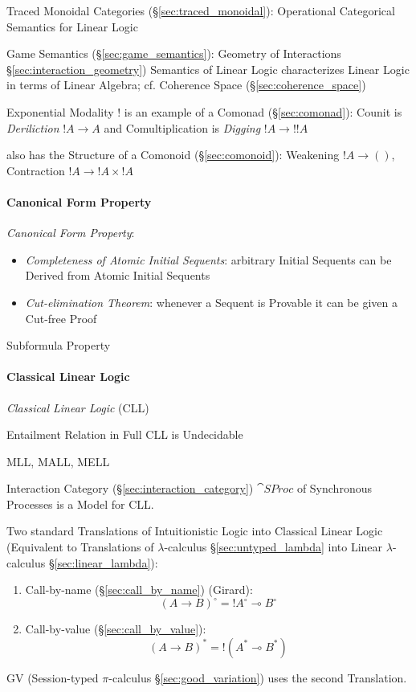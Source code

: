 Traced Monoidal Categories (\S\ref{sec:traced_monoidal}): Operational
Categorical Semantics for Linear Logic

Game Semantics (\S\ref{sec:game_semantics}): Geometry of Interactions
\S\ref{sec:interaction_geometry}) Semantics of Linear Logic
characterizes Linear Logic in terms of Linear Algebra; cf. Coherence
Space (\S\ref{sec:coherence_space})

Exponential Modality $!$ is an example of a Comonad
(\S\ref{sec:comonad}): Counit is \emph{Deriliction} $!A \rightarrow A$
and Comultiplication is \emph{Digging} $!A \rightarrow !!A$

also has the Structure of a Comonoid (\S\ref{sec:comonoid}): Weakening
$!A \rightarrow ()$, Contraction $!A \rightarrow !A \times !A$



\paragraph{Canonical Form Property}\label{sec:canonical_form_property}\hfill

\emph{Canonical Form Property}:
\begin{itemize}
  \item \emph{Completeness of Atomic Initial Sequents}: arbitrary
    Initial Sequents can be Derived from Atomic Initial Sequents
  \item \emph{Cut-elimination Theorem}: whenever a Sequent is Provable
    it can be given a Cut-free Proof
\end{itemize}

Subformula Property



\paragraph{Classical Linear Logic}\label{sec:cll} \hfill

\emph{Classical Linear Logic} (CLL)

Entailment Relation in Full CLL is Undecidable

MLL, MALL, MELL

Interaction Category (\S\ref{sec:interaction_category}) $\cat{SProc}$
of Synchronous Processes is a Model for CLL.

Two standard Translations of Intuitionistic Logic into Classical
Linear Logic (Equivalent to Translations of $\lambda$-calculus
\S\ref{sec:untyped_lambda} into Linear
$\lambda$-calculus \S\ref{sec:linear_lambda}):\cite{wadler12}
\begin{enumerate}
  \item Call-by-name (\S\ref{sec:call_by_name}) (Girard):
\[
  (A \rightarrow B)^\circ = !A^\circ \multimap B^\circ
\]
  \item Call-by-value (\S\ref{sec:call_by_value}):
\[
  (A \rightarrow B)^* = !(A^* \multimap B^*)
\]
\end{enumerate}
GV (Session-typed $\pi$-calculus \S\ref{sec:good_variation}) uses the
second Translation.

